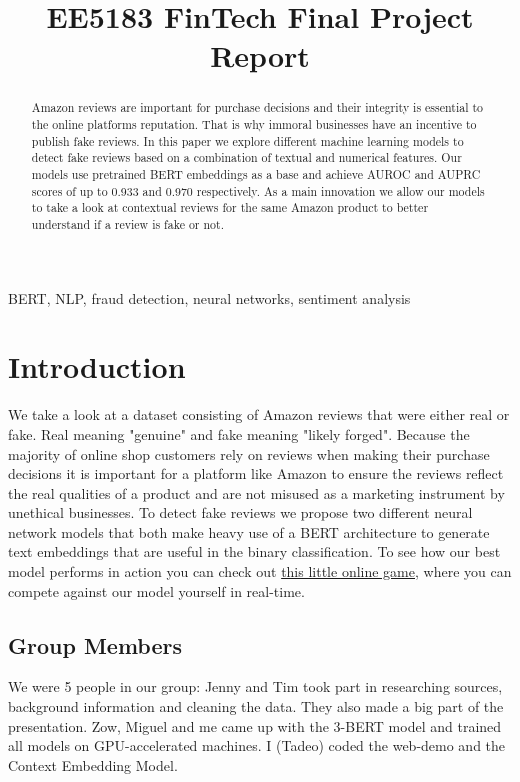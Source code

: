 \documentclass[utf8x]{ctexart}
\title{EE5183 FinTech Final Project Report}
\begin{document}
%
\maketitle
%
\begin{abstract}
  Amazon reviews are important for purchase decisions and their integrity is essential to the online platforms reputation. That is why immoral businesses have an incentive to publish fake reviews. In this paper we explore different machine learning models to detect fake reviews based on a combination of textual and numerical features. Our models use pretrained BERT embeddings as a base and achieve AUROC and AUPRC scores of up to 0.933 and 0.970 respectively.
  As a main innovation we allow our models to take a look at contextual reviews for the same Amazon product to better understand if a review is fake or not.

\end{abstract}
%
\begin{keywords}
  BERT, NLP, fraud detection, neural networks, sentiment analysis
\end{keywords}
%
\section{Introduction}
\label{sec:intro}

We take a look at a dataset consisting of Amazon reviews that were either real or fake. Real meaning "genuine" and fake meaning "likely forged".
Because the majority of online shop customers rely on reviews when making their purchase decisions it is important for a platform like Amazon to ensure the reviews reflect the real qualities of a product and are not misused as a marketing instrument by unethical businesses.
To detect fake reviews we propose two different neural network models that both make heavy use of a BERT architecture to generate text embeddings that are useful in the binary classification. To see how our best model performs in action you can check out \href{https://tadeohepperle.com/amazon-fake-reviews/}{this little online game}, where you can compete against our model yourself in real-time.

\subsection{Group Members}

We were 5 people in our group: Jenny and Tim took part in researching sources, background information and cleaning the data. They also made a big part of the presentation. Zow, Miguel and me came up with the 3-BERT model and trained all models on GPU-accelerated machines. I (Tadeo) coded the web-demo and the Context Embedding Model.
\end{document}
